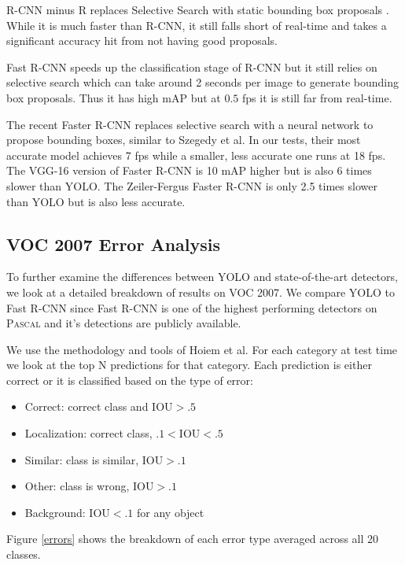 \documentclass[10pt,twocolumn,letterpaper]{article}
\begin{document}
R-CNN minus R replaces Selective Search with static bounding box proposals \cite{lenc2015r}. While it is much faster than R-CNN, it still falls short of real-time and takes a significant accuracy hit from not having good proposals. 

Fast R-CNN speeds up the classification stage of R-CNN but it still relies on selective search which can take around 2 seconds per image to generate bounding box proposals. Thus it has high mAP but at $0.5$ fps it is still far from real-time.

The recent Faster R-CNN replaces selective search with a neural network to propose bounding boxes, similar to Szegedy et al. \cite{erhan2014scalable} In our tests, their most accurate model achieves 7 fps while a smaller, less accurate one runs at 18 fps. The VGG-16 version of Faster R-CNN is 10 mAP higher but is also 6 times slower than YOLO. The Zeiler-Fergus Faster R-CNN is only 2.5 times slower than YOLO but is also less accurate.

\subsection{VOC 2007 Error Analysis}
\label{error}

To further examine the differences between YOLO and state-of-the-art detectors, we look at a detailed breakdown of results on VOC 2007. We compare YOLO to Fast R-CNN since Fast R-CNN is one of the highest performing detectors on \textsc{Pascal} and it's detections are publicly available.

We use the methodology and tools of Hoiem et al. \cite{hoiem2012diagnosing} For each category at test time we look at the top N predictions for that category. Each prediction is either correct or it is classified based on the type of error:

\begin{itemize}
\itemsep0em
\item Correct: correct class and $\textrm{IOU} > .5$
\item Localization: correct class, $.1 < \textrm{IOU} < .5$
\item Similar: class is similar, $\textrm{IOU} > .1$
\item Other: class is wrong, $\textrm{IOU} > .1$
\item Background: $\textrm{IOU} < .1$ for any object
\end{itemize}

Figure \ref{errors} shows the breakdown of each error type averaged across all 20 classes.
\end{document}
